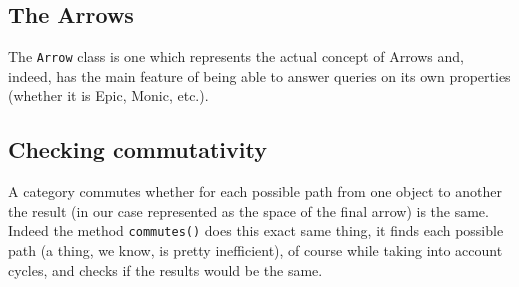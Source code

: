 \documentclass{article}
\begin{document}
    \subsection{The Arrows}
        The \texttt{Arrow} class is one which represents the actual concept of Arrows and, indeed, has the main feature of being able to answer queries on its own properties (whether it is Epic, Monic, etc.).
    \subsection{Checking commutativity}
        A category commutes whether for each possible path from one object to another the result (in our case represented as the space of the final arrow) is the same. Indeed the method \texttt{commutes()} does this exact same thing, it finds each possible path (a thing, we know, is pretty inefficient), of course while taking into account cycles, and checks if the results would be the same.
\end{document}
